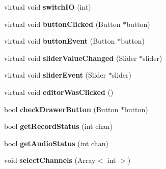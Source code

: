 \begin{DoxyCompactItemize}
\item 
\hypertarget{classGenericEditor_acd818101b35bd11e9d2399397a7c6ce7}{virtual void {\bfseries switch\-I\-O} (int)}\label{classGenericEditor_acd818101b35bd11e9d2399397a7c6ce7}

\item 
\hypertarget{classGenericEditor_a173791183751d6d59a82d56bf1e76073}{virtual void {\bfseries button\-Clicked} (Button $\ast$button)}\label{classGenericEditor_a173791183751d6d59a82d56bf1e76073}

\item 
\hypertarget{classGenericEditor_a83ae83a2c671317b4f4e07265c76aced}{virtual void {\bfseries button\-Event} (Button $\ast$button)}\label{classGenericEditor_a83ae83a2c671317b4f4e07265c76aced}

\item 
\hypertarget{classGenericEditor_aba93f26ee969aa06a78e723378a175ad}{virtual void {\bfseries slider\-Value\-Changed} (Slider $\ast$slider)}\label{classGenericEditor_aba93f26ee969aa06a78e723378a175ad}

\item 
\hypertarget{classGenericEditor_a0d8e6f21e173e9ab2588ee69b94483b0}{virtual void {\bfseries slider\-Event} (Slider $\ast$slider)}\label{classGenericEditor_a0d8e6f21e173e9ab2588ee69b94483b0}

\item 
\hypertarget{classGenericEditor_a255d76cc78f46761e10d65523512f306}{virtual void {\bfseries editor\-Was\-Clicked} ()}\label{classGenericEditor_a255d76cc78f46761e10d65523512f306}

\item 
\hypertarget{classGenericEditor_ac25d5d6e473cf8c8dde7490e5008c4fb}{bool {\bfseries check\-Drawer\-Button} (Button $\ast$button)}\label{classGenericEditor_ac25d5d6e473cf8c8dde7490e5008c4fb}

\item 
\hypertarget{classGenericEditor_a506f7e0099f41148a4a930f19eb9a13c}{bool {\bfseries get\-Record\-Status} (int chan)}\label{classGenericEditor_a506f7e0099f41148a4a930f19eb9a13c}

\item 
\hypertarget{classGenericEditor_a3b176ac12dd5f498630ee131be1338f3}{bool {\bfseries get\-Audio\-Status} (int chan)}\label{classGenericEditor_a3b176ac12dd5f498630ee131be1338f3}

\item 
\hypertarget{classGenericEditor_a2a60858cac03995dc95a77fef58de214}{void {\bfseries select\-Channels} (Array$<$ int $>$)}\label{classGenericEditor_a2a60858cac03995dc95a77fef58de214}


\end{DoxyCompactItemize}
